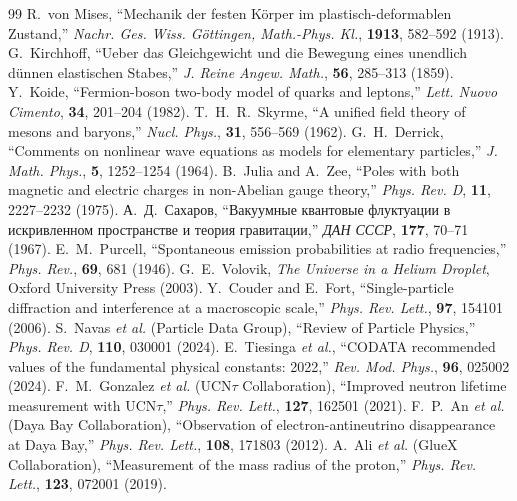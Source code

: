 \documentclass[12pt,a4paper]{article}
\begin{document}
	\begin{thebibliography}{99}
		 R.~von Mises, ``Mechanik der festen K{\"o}rper im plastisch-deformablen Zustand,'' \textit{Nachr. Ges. Wiss. G{\"o}ttingen, Math.-Phys. Kl.}, \textbf{1913}, 582--592 (1913).
		 G.~Kirchhoff, ``Ueber das Gleichgewicht und die Bewegung eines unendlich d{\"u}nnen elastischen Stabes,'' \textit{J. Reine Angew. Math.}, \textbf{56}, 285--313 (1859).
		 Y.~Koide, ``Fermion-boson two-body model of quarks and leptons,'' \textit{Lett. Nuovo Cimento}, \textbf{34}, 201--204 (1982).
		 T.~H.~R.~Skyrme, ``A unified field theory of mesons and baryons,'' \textit{Nucl. Phys.}, \textbf{31}, 556--569 (1962).
		 G.~H.~Derrick, ``Comments on nonlinear wave equations as models for elementary particles,'' \textit{J. Math. Phys.}, \textbf{5}, 1252--1254 (1964).
		 B.~Julia and A.~Zee, ``Poles with both magnetic and electric charges in non-Abelian gauge theory,'' \textit{Phys. Rev. D}, \textbf{11}, 2227--2232 (1975).
		 А.~Д.~Сахаров, ``Вакуумные квантовые флуктуации в искривленном пространстве и теория гравитации,'' \textit{ДАН СССР}, \textbf{177}, 70--71 (1967).
		 E.~M.~Purcell, ``Spontaneous emission probabilities at radio frequencies,'' \textit{Phys. Rev.}, \textbf{69}, 681 (1946).
		 G.~E.~Volovik, \textit{The Universe in a Helium Droplet}, Oxford University Press (2003).
		 Y.~Couder and E.~Fort, ``Single-particle diffraction and interference at a macroscopic scale,'' \textit{Phys. Rev. Lett.}, \textbf{97}, 154101 (2006).
		 S.~Navas \textit{et al.} (Particle Data Group), ``Review of Particle Physics,'' \textit{Phys. Rev. D}, \textbf{110}, 030001 (2024).
		 E.~Tiesinga \textit{et al.}, ``CODATA recommended values of the fundamental physical constants: 2022,'' \textit{Rev. Mod. Phys.}, \textbf{96}, 025002 (2024).
		 F.~M.~Gonzalez \textit{et al.} (UCN$\tau$ Collaboration), ``Improved neutron lifetime measurement with UCN$\tau$,'' \textit{Phys. Rev. Lett.}, \textbf{127}, 162501 (2021).
		 F.~P.~An \textit{et al.} (Daya Bay Collaboration), ``Observation of electron-antineutrino disappearance at Daya Bay,'' \textit{Phys. Rev. Lett.}, \textbf{108}, 171803 (2012).
		 A.~Ali \textit{et al.} (GlueX Collaboration), ``Measurement of the mass radius of the proton,'' \textit{Phys. Rev. Lett.}, \textbf{123}, 072001 (2019).
	\end{thebibliography}
	
\end{document}
